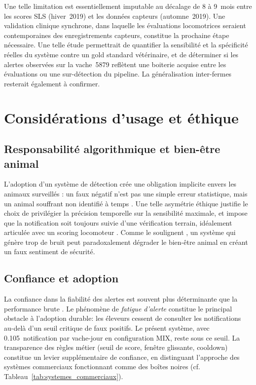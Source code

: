 Une telle limitation est essentiellement imputable au décalage de 8 à 9~mois entre les
scores SLS (hiver~2019) et les données capteurs (automne~2019). Une validation
clinique synchrone, dans laquelle les évaluations locomotrices seraient contemporaines
des enregistrements capteurs, constitue la prochaine étape nécessaire. Une telle
étude permettrait de quantifier la sensibilité et la spécificité réelles du système
contre un gold standard vétérinaire, et de déterminer si les alertes observées sur
la vache~5879 reflètent une boiterie acquise entre les évaluations ou une
sur-détection du pipeline. La généralisation inter-fermes resterait également à
confirmer.

\FloatBarrier
\section{Considérations d'usage et éthique}

\subsection{Responsabilité algorithmique et bien-être animal}

L'adoption d'un système de détection crée une obligation implicite envers les animaux
surveillés \citep{broom2017animal}: un faux négatif n'est pas une simple erreur
statistique, mais un animal souffrant non identifié à temps \citep{whay2003assessment}.
Une telle asymétrie éthique justifie le choix de privilégier la précision temporelle sur
la sensibilité maximale, et impose que la notification soit toujours suivie d'une
vérification terrain, idéalement articulée avec un scoring locomoteur
\citep{sprecher1997lameness,ahdb_mobility_scoring_dairy_cows,dairynz_preventing_managing_lameness_guide_2025}.
Comme le soulignent \cite{estevez2019animal}, un système qui
génère trop de bruit peut paradoxalement dégrader le bien-être animal en créant un faux
sentiment de sécurité.

\subsection{Confiance et adoption}

La confiance dans la fiabilité des alertes est souvent plus déterminante que la performance
brute \citep{bewley2015precision,venkatesh2003user}. Le phénomène de \textit{fatigue d'alerte}
\citep{rutten2013invited} constitue le principal obstacle à l'adoption durable: les
éleveurs cessent de consulter les notifications au-delà d'un seuil critique de faux
positifs. Le présent système, avec 0.105~notification par vache-jour en configuration MIX,
reste sous ce seuil. La transparence des règles métier (seuil de score, fenêtre glissante,
cooldown) constitue un levier supplémentaire de confiance, en distinguant l'approche des
systèmes commerciaux fonctionnant comme des boîtes noires
(cf. Tableau~\ref{tab:systemes_commerciaux}).

